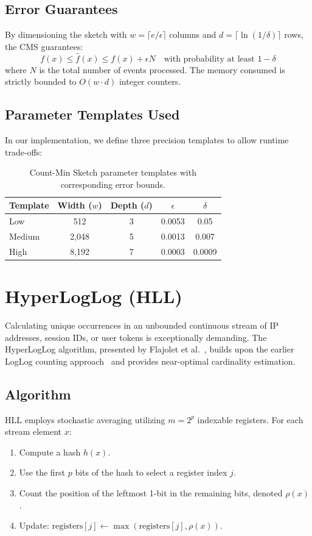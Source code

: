 \subsection{Error Guarantees}
By dimensioning the sketch with $w = \lceil e/\epsilon \rceil$ columns and $d = \lceil \ln(1/\delta) \rceil$ rows, the CMS guarantees:
\begin{equation}
    f(x) \le \hat{f}(x) \le f(x) + \epsilon N \quad \text{with probability at least } 1-\delta
\end{equation}
where $N$ is the total number of events processed. The memory consumed is strictly bounded to $O(w \cdot d)$ integer counters.

\subsection{Parameter Templates Used}
In our implementation, we define three precision templates to allow runtime trade-offs:

\begin{table}[htbp]
\centering
\begin{tabular}{l c c c c}
\toprule
\textbf{Template} & \textbf{Width ($w$)} & \textbf{Depth ($d$)} & $\epsilon$ & $\delta$ \\
\midrule
Low    & 512   & 3 & 0.0053 & 0.05 \\
Medium & 2,048 & 5 & 0.0013 & 0.007 \\
High   & 8,192 & 7 & 0.0003 & 0.0009 \\
\bottomrule
\end{tabular}
\caption{Count-Min Sketch parameter templates with corresponding error bounds.}
\label{tab:cms_templates}
\end{table}

\section{HyperLogLog (HLL)}

Calculating unique occurrences in an unbounded continuous stream of IP addresses, session IDs, or user tokens is exceptionally demanding. The HyperLogLog algorithm, presented by Flajolet et al.~\cite{hll}, builds upon the earlier LogLog counting approach~\cite{durand2003loglog} and provides near-optimal cardinality estimation.

\subsection{Algorithm}
HLL employs stochastic averaging utilizing $m = 2^p$ indexable registers. For each stream element $x$:
\begin{enumerate}
    \item Compute a hash $h(x)$.
    \item Use the first $p$ bits of the hash to select a register index $j$.
    \item Count the position of the leftmost 1-bit in the remaining bits, denoted $\rho(x)$.
    \item Update: $\text{registers}[j] \leftarrow \max(\text{registers}[j], \rho(x))$.
\end{enumerate}

